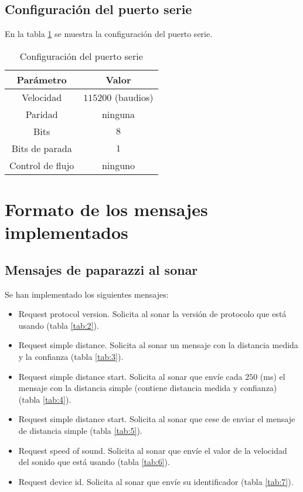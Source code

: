 \subsection{Configuración del puerto serie}
En la tabla \ref{tab:1} se muestra la configuración del puerto serie.
\begin{table}[h]
	\centering
	\caption{Configuración del puerto serie}
	\begin{tabular}{|c|c|}
		\hline
		\textbf{Parámetro} & \textbf{Valor} \\ \hline \hline
		Velocidad  & $115200$ (baudios) \\\hline 
		Paridad & ninguna  \\ \hline
		Bits & $8$ \\ \hline 
		Bits de parada & $1$  \\ \hline
		Control de flujo & ninguno \\ \hline
	\end{tabular}
	\label{tab:1}
\end{table}

\section{Formato de los mensajes implementados} \label{sec:2}

\subsection{Mensajes de paparazzi al sonar}

Se han implementado los siguientes mensajes:
\begin{itemize}
	\item Request protocol version. Solicita al sonar la versión de protocolo que está usando (tabla \ref{tab:2}).
	\item Request simple distance. Solicita al sonar un mensaje con la distancia medida y la confianza (tabla \ref{tab:3}).
	\item Request simple distance start. Solicita al sonar que envíe cada $250$ (ms) el mensaje con la distancia simple (contiene distancia medida y confianza) (tabla \ref{tab:4}).
	\item Request simple distance start. Solicita al sonar que cese de enviar el mensaje de distancia simple (tabla \ref{tab:5}).
	\item Request speed of sound. Solicita al sonar que envíe el valor de la velocidad del sonido que está usando (tabla \ref{tab:6}).
	\item Request device id. Solicita al sonar que envíe su identificador (tabla \ref{tab:7}).
\end{itemize}

